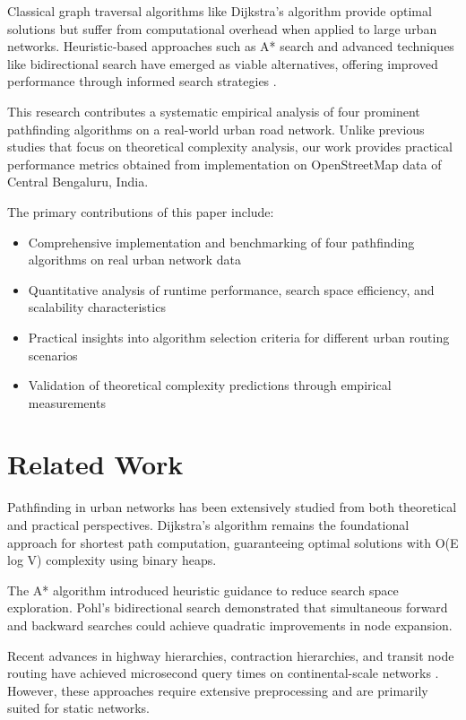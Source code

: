 \documentclass[conference]{IEEEtran}
\begin{document}
Classical graph traversal algorithms like Dijkstra's algorithm provide optimal solutions but suffer from computational overhead when applied to large urban networks. Heuristic-based approaches such as A* search and advanced techniques like bidirectional search have emerged as viable alternatives, offering improved performance through informed search strategies \cite{hart1968formal}.

This research contributes a systematic empirical analysis of four prominent pathfinding algorithms on a real-world urban road network. Unlike previous studies that focus on theoretical complexity analysis, our work provides practical performance metrics obtained from implementation on OpenStreetMap data of Central Bengaluru, India.

The primary contributions of this paper include:
\begin{itemize}
\item Comprehensive implementation and benchmarking of four pathfinding algorithms on real urban network data
\item Quantitative analysis of runtime performance, search space efficiency, and scalability characteristics
\item Practical insights into algorithm selection criteria for different urban routing scenarios
\item Validation of theoretical complexity predictions through empirical measurements
\end{itemize}

\section{Related Work}

Pathfinding in urban networks has been extensively studied from both theoretical and practical perspectives. Dijkstra's algorithm \cite{dijkstra1959note} remains the foundational approach for shortest path computation, guaranteeing optimal solutions with O(E log V) complexity using binary heaps.

The A* algorithm \cite{hart1968formal} introduced heuristic guidance to reduce search space exploration. Pohl's bidirectional search \cite{pohl1971bidirectional} demonstrated that simultaneous forward and backward searches could achieve quadratic improvements in node expansion.

Recent advances in highway hierarchies, contraction hierarchies, and transit node routing have achieved microsecond query times on continental-scale networks \cite{geisberger2008contraction}. However, these approaches require extensive preprocessing and are primarily suited for static networks.
\end{document}
